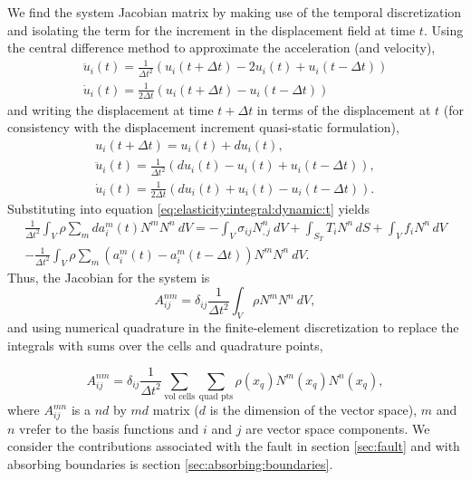 We find the system Jacobian matrix by making use of the temporal discretization
and isolating the term for the increment in the displacement field
at time $t$. Using the central difference method to approximate the
acceleration (and velocity),
\begin{gather}
\ddot{u}_{i}(t)=\frac{1}{\Delta t^{2}}\left(u_{i}(t+\Delta t)-2u_{i}(t)+u_{i}(t-\Delta t)\right)\\
\dot{u}_{i}(t)=\frac{1}{2\Delta t}\left(u_{i}(t+\Delta t)-u_{i}(t-\Delta t)\right)
\end{gather}
and writing the displacement at time $t+\Delta t$ in terms of the
displacement at $t$ (for consistency with the displacement increment
quasi-static formulation),
\begin{gather}
u_{i}(t+\Delta t)=u_{i}(t)+du_{i}(t),\\
\ddot{u}_{i}(t)=\frac{1}{\Delta t^{2}}\left(du_{i}(t)-u_{i}(t)+u_{i}(t-\Delta t)\right),\\
\dot{u}_{i}(t)=\frac{1}{2\Delta t}\left(du_{i}(t)+u_{i}(t)-u_{i}(t-\Delta t)\right).
\end{gather}
Substituting into equation \eqref{eq:elasticity:integral:dynamic:t}
yields
\begin{multline}
\frac{1}{\Delta t^{2}}\int_{V}\rho\sum_{m}da_{i}^{m}(t)N^{m}N^{n}\ dV=-\int_{V}\sigma_{ij}N_{,j}^{n}\: dV+\int_{S_{T}}T_{i}N^{n}\, dS+\int_{V}f_{i}N^{n}\, dV\\
-\frac{1}{\Delta t^{2}}\int_{V}\rho\sum_{m}(a_{i}^{m}(t)-a_{i}^{m}(t-\Delta t))N^{m}N^{n}\ dV.
\end{multline}
Thus, the Jacobian for the system is
\begin{equation}
A_{ij}^{nm}=\delta_{ij}\frac{1}{\Delta t^{2}}\int_{V}\rho N^{m}N^{n}\ dV,
\end{equation}
and using numerical quadrature in the finite-element discretization
to replace the integrals with sums over the cells and quadrature points,

\begin{equation}
A_{ij}^{nm}=\delta_{ij}\frac{1}{\Delta t^{2}}\sum_{\text{vol cells}}\sum_{\text{quad pts}}\rho(x_{q})N^{m}(x_{q})N^{n}(x_{q}),
\end{equation}
where $A_{ij}^{mn}$ is a $nd$ by $md$ matrix ($d$ is the dimension
of the vector space), $m$ and $n$ vrefer to the basis functions and
$i$ and $j$ are vector space components. We consider the contributions
associated with the fault in section \vref{sec:fault} and with absorbing
boundaries is section \vref{sec:absorbing:boundaries}.


